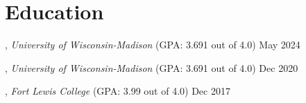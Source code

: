 \section{Education}

, \textit{University of Wisconsin-Madison} (GPA: 3.691 out of 4.0) \hfill May 2024

, \textit{University of Wisconsin-Madison} (GPA: 3.691 out of 4.0) \hfill Dec 2020

, \textit{Fort Lewis College} (GPA: 3.99 out of 4.0) \hfill	Dec 2017